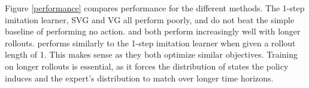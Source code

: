 \documentclass{article} %
\begin{document}

Figure \ref{performance} compares performance for the different methods.
The 1-step imitation learner, SVG and VG all perform poorly, and do not beat the simple baseline of performing no action.
\modelnamedrop and \modelnameil both perform increasingly well with longer rollouts.
\modelnameil performs similarly to the 1-step imitation learner when given a rollout length of 1.
This makes sense as they both optimize similar objectives. 
Training on longer rollouts is essential, as it forces the distribution of states the policy induces and the expert's distribution to match over longer time horizons.
\end{document}
